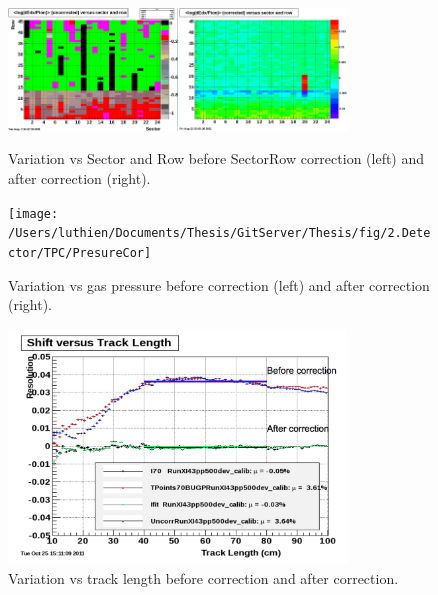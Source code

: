 \begin{figure}
\begin{centering}
\includegraphics[width=0.4\textwidth]{fig/2.Detector/TPC/pass0_SectorRow}\includegraphics[width=0.4\textwidth]{fig/2.Detector/TPC/pass2_SecRow_mu}
\par\end{centering}

\protect\caption{Variation vs Sector and Row before SectorRow correction (left) and
after correction (right).}


\label{fig:SecRowCor}
\end{figure}


\begin{figure}
\begin{centering}
\texttt{[image: /Users/luthien/Documents/Thesis/GitServer/Thesis/fig/2.Detector/TPC/PresureCor]}
\par\end{centering}

\protect\caption{Variation vs gas pressure before correction (left) and after correction
(right).}


\label{fig:PresureCor}
\end{figure}


\begin{figure}
\begin{centering}
\includegraphics[width=0.8\textwidth]{fig/2.Detector/TPC/TrackLengthCor}
\par\end{centering}

\protect\caption{Variation vs track length before correction and after correction.}


\label{fig:TrackLengthCor}
\end{figure}


